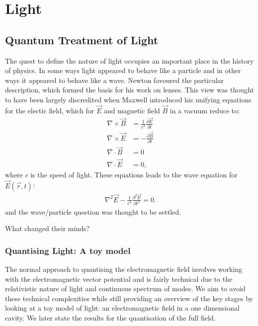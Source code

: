 \chapter{Light} 
\label{ch:Light}

\section{Quantum Treatment of Light}

The quest to define the nature of light occupies an important place in the history of physics. In some ways light appeared to behave like a particle and in other ways it appeared to behave like a wave. Newton favoured the particular description, which formed the basis for his work on lenses. This view was thought to have been largely discredited when Maxwell introduced his unifying equations for the electic field, which for $\vec{E}$ and magnetic field $\vec{B}$ in a vacuum reduce to:
\begin{align}
  \nabla \times \vec{B} &= \frac{1}{c^2} \frac{\partial \vec{E}}{\partial t} \label{maxwell_be} \\
  \nabla \times \vec{E} &= - \frac{\partial \vec{B}}{\partial t}\\
  \nabla \cdot \vec{B} &= 0 \\
  \nabla \cdot \vec{E} &= 0,
\end{align}
where $c$ is the speed of light. These equations leads to the wave equation for $\vec{E}(\vec{r}, t)$:
\begin{align}\label{wave_eq}
  \nabla^2\vec{E} - \frac{1}{c^2} \frac{\partial^2 \vec{E}}{\partial t^2} = 0.
\end{align}
and the wave/particle question was thought to be settled.

What changed their minds?


\subsection{Quantising Light: A toy model}

The normal approach to quantising the electromagnetic field involves working with the electromagnetic vector potential and is fairly technical due to the relativistic nature of light and continuous spectrum of modes. We aim to avoid these technical complexities while still providing an overview of the key stages by looking at a toy model of light: an electromagnetic field in a one dimensional cavity. We later state the results for the quantisation of the full field.


